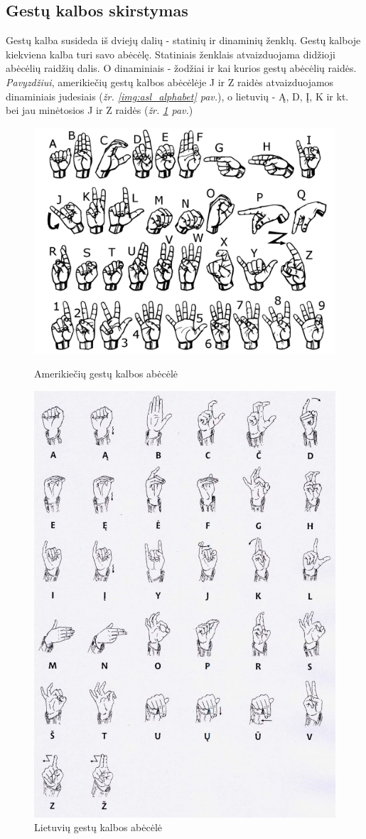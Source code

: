 \documentclass{VUMIFInfKursinis}
\begin{document}
\subsection{Gestų kalbos skirstymas}
Gestų kalba susideda iš dviejų dalių - statinių ir dinaminių ženklų. Gestų kalboje kiekviena kalba turi savo abėcėlę. Statiniais ženklais atvaizduojama didžioji abėcėlių raidžių dalis. O dinaminiais - žodžiai ir kai kurios gestų abėcėlių raidės. \textit{Pavyzdžiui}, amerikiečių gestų kalbos abėcėlėje J ir Z raidės atvaizduojamos dinaminiais judesiais (\textit{žr. \ref{img:asl_alphabet} pav.}), o lietuvių - Ą, D, Į, K ir kt. bei jau minėtosios J ir Z raidės (\textit{žr. \ref{img:lsl_alphabet} pav.})

\begin{figure}[H]
	\centering
	\begin{minipage}{.5\textwidth}
		\centering
		\includegraphics[width=.8\linewidth]{img/asl_alphabet}
		\caption{Amerikiečių gestų kalbos abėcėlė}
		\label{img:asl_alphabet}
	\end{minipage}%
	\begin{minipage}{.5\textwidth}
		\centering
		\includegraphics[width=.5\linewidth]{img/lsl_alphabet}
		\caption{Lietuvių gestų kalbos abėcėlė}
		\label{img:lsl_alphabet}
	\end{minipage}
\end{figure}
\end{document}
